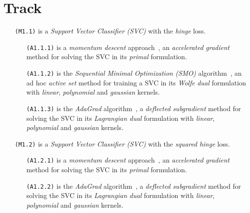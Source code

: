 \section{Track}

\begin{itemize}
\item[\texttt{(M1.1)}] is a \emph{Support Vector Classifier (SVC)} with the \emph{hinge} loss.

\begin{itemize}
\item[\texttt{(A1.1.1)}] is a \emph{momentum descent} approach~\cite{polyak1964some, nesterov1998introductory, nesterov1983method}, an \emph{accelerated gradient} method for solving the SVC in its \emph{primal} formulation.

\item[\texttt{(A1.1.2)}] is the \emph{Sequential Minimal Optimization (SMO)} algorithm~\cite{platt1998sequential, keerthi2001improvements}, an ad hoc \emph{active set} method for training a SVC in its \emph{Wolfe dual} formulation with \emph{linear}, \emph{polynomial} and \emph{gaussian} kernels.

\item[\texttt{(A1.1.3)}] is the \emph{AdaGrad} algorithm~\cite{duchi2011adaptive}, a \emph{deflected subgradient} method for solving the SVC in its \emph{Lagrangian dual} formulation with \emph{linear}, \emph{polynomial} and \emph{gaussian} kernels.
\end{itemize}

\end{itemize}

\begin{itemize}
\item[\texttt{(M1.2)}] is a \emph{Support Vector Classifier (SVC)} with the \emph{squared hinge} loss.

\begin{itemize}
\item[\texttt{(A1.2.1)}] is a \emph{momentum descent} approach~\cite{polyak1964some, nesterov1998introductory, nesterov1983method}, an \emph{accelerated gradient} method for solving the SVC in its \emph{primal} formulation.

\item[\texttt{(A1.2.2)}] is the \emph{AdaGrad} algorithm~\cite{duchi2011adaptive}, a \emph{deflected subgradient} method for solving the SVC in its \emph{Lagrangian dual} formulation with \emph{linear}, \emph{polynomial} and \emph{gaussian} kernels.
\end{itemize}

\end{itemize}

